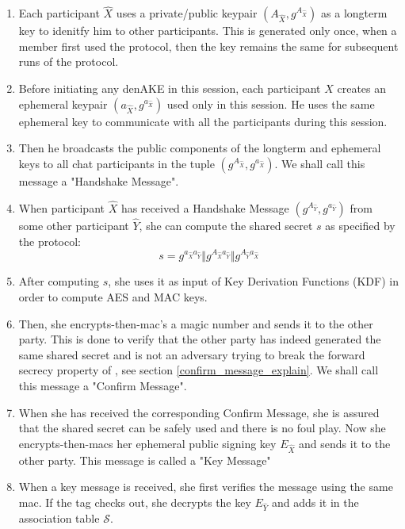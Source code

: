 \begin{enumerate}

  \item Each participant $\hat{X}$ uses a private/public \dhname keypair $(A_{\hat{X}}, g^{A_{\hat{X}}})$ as a longterm key to idenitfy him to other participants. This is generated only once, when a member first used the protocol, then the key remains the same for subsequent runs of the protocol.

  \item Before initiating any denAKE in this session, each participant $\hat{X}$ creates an ephemeral \dhname keypair $(a_{\hat{X}},g^{a_{\hat{X}}})$ used only in this session. He uses the same ephemeral key	to communicate with all the participants during this session.

  \item Then he broadcasts the public components of the longterm and ephemeral keys to all chat participants in the tuple $(g^{A_{\hat{X}}}, g^{a_{\hat{X}}})$. We shall call this message a "Handshake Message".

  \item When participant $\hat{X}$ has received a Handshake Message $(g^{A_{\hat{Y}}}, g^{a_{\hat{Y}}})$ from some other participant $\hat{Y}$, she can compute the shared secret $s$ as specified by the \tdhname protocol:
\[
  s = g^{a_{\hat{X}}a_{\hat{Y}}} \Vert g^{A_{\hat{X}}a_{\hat{Y}}} \Vert g^{A_{\hat{Y}}a_{\hat{X}}}
\]

  \item After computing $s$, she uses it as input of Key Derivation Functions (KDF) in order to compute AES and MAC keys.
  
  \item Then, she encrypts-then-mac's a magic number and sends it to the other party. This is done to verify that the other party has indeed generated the same shared secret and is not an adversary trying to break the forward secrecy property of \tdhname, see section \ref{confirm_message_explain}. We shall call this message a "Confirm Message".

  \item When she has received the corresponding Confirm Message, she is assured that the shared secret can be safely used and there is no foul play. Now she encrypts-then-macs her ephemeral public signing key $E_{\hat{X}}$ and sends it to the other party. This message is called a "Key Message"

  \item When a key message is received, she first verifies the message using the same mac. If the tag checks out, she decrypts the key $E_{\hat{Y}}$ and adds it in the association table $\mathcal{S}$.
  
\end{enumerate}

